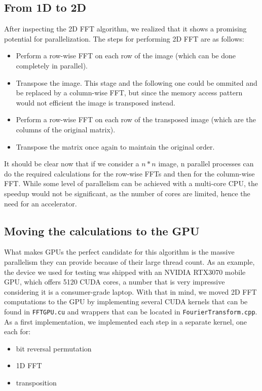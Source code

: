 \subsection{From 1D to 2D}
After inspecting the 2D FFT algorithm, we realized that it shows a promising potential for parallelization. The steps for performing 2D FFT are as follows: 
\begin{itemize}
    \item Perform a row-wise FFT on each row of the image (which can be done completely in parallel).
    \item Transpose the image. This stage and the following one could be ommited and be replaced by a column-wise FFT, but since the memory access pattern would not efficient the image is transposed instead.
    \item Perform a row-wise FFT on each row of the transposed image (which are the columns of the original matrix).
    \item Transpose the matrix once again to maintain the original order.
\end{itemize}
It should be clear now that if we consider a \(n * n \) image, n parallel processes can do the required calculations for the row-wise FFTs and then for the column-wise FFT. While some level of parallelism can be achieved with a multi-core CPU, the speedup would not be significant, as the number of cores are limited, hence the need for an accelerator.

\subsection{Moving the calculations to the GPU}
What makes GPUs the perfect candidate for this algorithm is the massive parallelism they can provide because of their large thread count. As an example, the device we used for testing was shipped with an NVIDIA RTX3070 mobile GPU, which offers 5120 CUDA cores, a number that is very impressive considering it is a consumer-grade laptop. With that in mind, we moved 2D FFT computations to the GPU by implementing several CUDA kernels that can be found in \texttt{FFTGPU.cu} and wrappers that can be located in \texttt{FourierTransform.cpp}.
As a first implementation, we implemented each step in a separate kernel, one each for:
\begin{itemize}
    \item bit reversal permutation
    \item 1D FFT
    \item transposition
\end{itemize}

